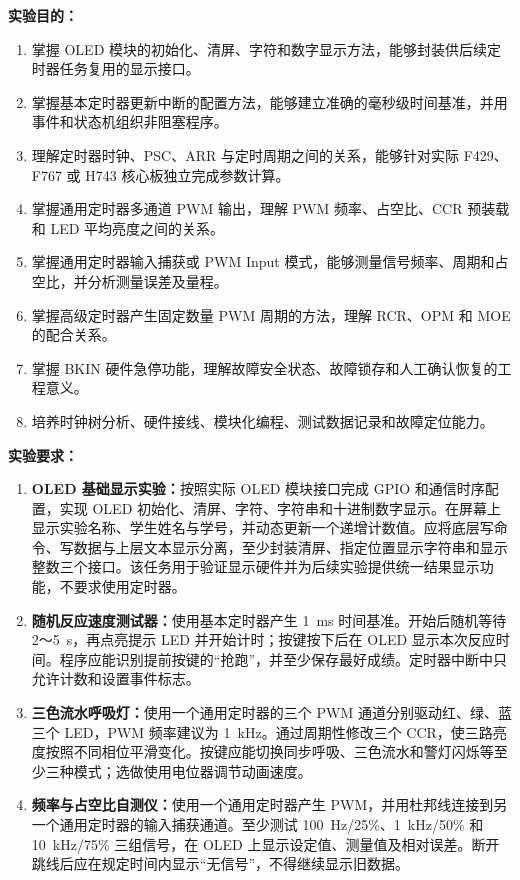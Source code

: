 \documentclass[UTF8,zihao=5,fontset=fandol]{ctexart}
\begin{document}
\begin{reportsection}{\PurposeTitle}{}
  \textbf{实验目的：}
  \begin{enumerate}[label=\arabic*)]
    \item 掌握 OLED 模块的初始化、清屏、字符和数字显示方法，能够封装供后续定时器任务复用的显示接口。
    \item 掌握基本定时器更新中断的配置方法，能够建立准确的毫秒级时间基准，并用事件和状态机组织非阻塞程序。
    \item 理解定时器时钟、PSC、ARR 与定时周期之间的关系，能够针对实际 F429、F767 或 H743 核心板独立完成参数计算。
    \item 掌握通用定时器多通道 PWM 输出，理解 PWM 频率、占空比、CCR 预装载和 LED 平均亮度之间的关系。
    \item 掌握通用定时器输入捕获或 PWM Input 模式，能够测量信号频率、周期和占空比，并分析测量误差及量程。
    \item 掌握高级定时器产生固定数量 PWM 周期的方法，理解 RCR、OPM 和 MOE 的配合关系。
    \item 掌握 BKIN 硬件急停功能，理解故障安全状态、故障锁存和人工确认恢复的工程意义。
    \item 培养时钟树分析、硬件接线、模块化编程、测试数据记录和故障定位能力。
  \end{enumerate}

  \textbf{实验要求：}
  \begin{enumerate}[label=\arabic*)]
    \item \textbf{OLED 基础显示实验：}按照实际 OLED 模块接口完成 GPIO 和通信时序配置，实现 OLED 初始化、清屏、字符、字符串和十进制数字显示。在屏幕上显示实验名称、学生姓名与学号，并动态更新一个递增计数值。应将底层写命令、写数据与上层文本显示分离，至少封装清屏、指定位置显示字符串和显示整数三个接口。该任务用于验证显示硬件并为后续实验提供统一结果显示功能，不要求使用定时器。

    \item \textbf{随机反应速度测试器：}使用基本定时器产生 1~ms 时间基准。开始后随机等待 2～5~s，再点亮提示 LED 并开始计时；按键按下后在 OLED 显示本次反应时间。程序应能识别提前按键的“抢跑”，并至少保存最好成绩。定时器中断中只允许计数和设置事件标志。

    \item \textbf{三色流水呼吸灯：}使用一个通用定时器的三个 PWM 通道分别驱动红、绿、蓝三个 LED，PWM 频率建议为 1~kHz。通过周期性修改三个 CCR，使三路亮度按照不同相位平滑变化。按键应能切换同步呼吸、三色流水和警灯闪烁等至少三种模式；选做使用电位器调节动画速度。

    \item \textbf{频率与占空比自测仪：}使用一个通用定时器产生 PWM，并用杜邦线连接到另一个通用定时器的输入捕获通道。至少测试 100~Hz/25\%、1~kHz/50\% 和 10~kHz/75\% 三组信号，在 OLED 上显示设定值、测量值及相对误差。断开跳线后应在规定时间内显示“无信号”，不得继续显示旧数据。


\end{enumerate}
\end{reportsection}
\end{document}
